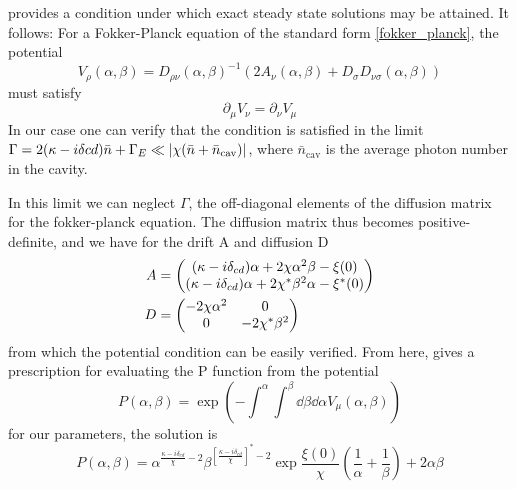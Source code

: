 \cite{Haken1975} provides a condition under which exact steady state solutions may be attained. It follows:
For a Fokker-Planck equation of the standard form \cref{fokker_planck}, the potential
\begin{equation}
  V_\rho(\alpha, \beta) = D_{\rho\nu}(\alpha, \beta)^{-1} (2A_\nu(\alpha, \beta) + D_\sigma D_{\nu\sigma}(\alpha, \beta))
\end{equation}
must satisfy
\begin{equation}
  \partial_\mu V_\nu = \partial_\nu V_\mu
\end{equation}
In our case one can verify that the condition is satisfied in the limit $\Gamma = 2(\kappa - i\delta{cd})\bar{n} + \Gamma_E \ll \abs{\chi( \bar{n} + \bar{n}_{\text{cav}} )}$, where $\bar{n}_{\text{cav}}$ is the average photon number in the cavity.

In this limit we can neglect $\Gamma$, the off-diagonal elements of the diffusion matrix for the fokker-planck equation.
The diffusion matrix thus becomes positive-definite, and we have for the drift A and diffusion D
\begin{align}
  A  &= \begin{pmatrix}
  \mqty{(\kappa - i\delta_{cd})\alpha + 2\chi\alpha^2 \beta - \xi(0)\\ (\kappa - i\delta_{cd})\alpha + 2\chi^* \beta^2 \alpha - \xi^*(0)}
       \end{pmatrix}\\
  D  &= \begin{pmatrix}
       \mqty{-2\chi\alpha^2 & 0 \\ 0 & -2 \chi^* \beta^2 }
       \end{pmatrix}
\end{align}
from which the potential condition can be easily verified. 
From here, \cite{Haken1975} gives a prescription for evaluating the P function from the potential
\begin{equation}
  P(\alpha, \beta) = \exp \left( - \int^\alpha \int^\beta \dd{\beta}\dd{\alpha} V_\mu (\alpha, \beta) \right)
\end{equation}
for our parameters, the solution is 
\begin{equation}
  P(\alpha, \beta) = \alpha^{\frac{\kappa-i\delta_{cd}}{\chi}-2} \beta^{{\left[\frac{\kappa-i\delta_{cd}}{\chi}\right]}^*-2}\exp{\frac{\xi(0)}{\chi}\left(\frac{1}{\alpha} + \frac{1}{\beta}\right) + 2\alpha\beta}
\end{equation}
